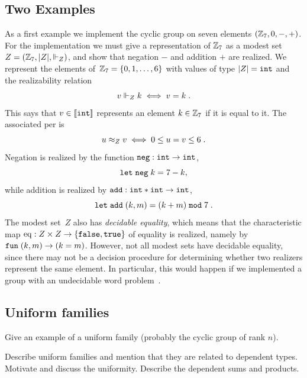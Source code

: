 \subsection{Two Examples}
\label{sec:examples-modest-sets}

As a first example we implement the cyclic group on seven elements
$(\mathbb{Z}_7, 0, {-}, {+})$. For the implementation we must give a
representation of $\mathbb{Z}_7$ as a modest set~$Z = (\mathbb{Z}_7, |Z|,
{\Vdash_Z})$, and show that negation $-$ and addition $+$ are realized.
We represent the elements of~$\mathbb{Z}_7 = \{0, 1, \ldots, 6\}$ with
values of type $|Z| = \mathtt{int}$ and the realizability relation
%
\begin{equation*}
  v \Vdash_Z k \iff v = k \;.
\end{equation*}
%
This says that $v \in [\![\mathtt{int}]\!]$ represents an element $k \in
\mathbb{Z}_7$ if it is equal to it. The associated per is
%
\begin{equation*}
  u \approx_Z v
  \iff
  0 \leq u = v \leq 6 \;.
\end{equation*}
%
Negation is realized by the function $\mathtt{neg}: \mathtt{int} \to \mathtt{int}$,
%
\begin{equation*}
  \mathtt{let}\;\mathtt{neg}\; k = 7 - k,
\end{equation*}
%
while addition is realized by $\mathtt{add}: \mathtt{int} * \mathtt{int} \to \mathtt{int}$,
%
\begin{equation*}
  \mathtt{let}\;\mathtt{add}\;(k,m) = (k + m) \;\mathtt{mod}\; 7\;.
\end{equation*}
%
The modest set~$Z$ also has \emph{decidable equality}, which means
that the characteristic map $\mathrm{eq} : Z \times Z \to
\{\mathtt{false}, \mathtt{true}\}$ of equality is realized, namely
by $\mathtt{fun}\;(k,m) \to (k=m)$. However, not all modest sets have decidable
equality, since there may not be a decision procedure for determining
whether two realizers represent the same element. In particular, this
would happen if we implemented a group with an undecidable word
problem~\cite{undecidable-word-problem}.




\subsection{Uniform families}
\label{sec:uniform-families}

Give an example of a uniform family (probably the cyclic group of rank
$n$).

Describe uniform families and mention that they are related to
dependent types. Motivate and discuss the uniformity. Describe the
dependent sums and products.


